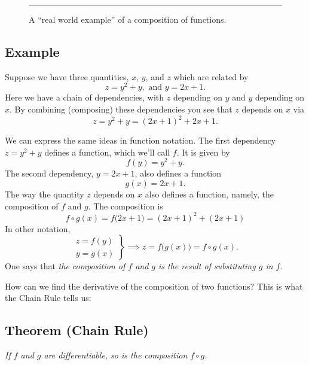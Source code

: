 \begin{figure}[t]
\begin{minipage}[b]{\textwidth}
    \rule{0pt}{6pt}




  \end{minipage}




  \noindent\rule{\textwidth}{1pt}




  \caption{A ``real world example'' of a composition of functions.}
  \label{fig:04growing-balloon}
\end{figure}




\subsection{Example} 
\label{sec:04composition-example}
Suppose we have three quantities, $x$, $y$, and $z$ which are related by
\[
z=y^2+y, \text{ and } y = 2x+1.
\]
Here we have a chain of dependencies, with $z$ depending on $y$ and $y$
depending on $x$.  By combining (composing) these dependencies you see that $z$
depends on $x$ via
\[
z = y^2+y = (2x+1)^2 + 2x+1.
\]




We can express the same ideas in function notation.  The first dependency
$z=y^2+y$ defines a function, which we'll call $f$.  It is given by
\[
f(y) = y^2+y.
\]
The second dependency, $y=2x+1$, also defines a function
\[
g(x) = 2x+1.
\]
The way the quantity $z$ depends on $x$ also defines a function, namely,
the composition of $f$ and $g$.  The composition is
\[
f\circ g(x) =f\bigl(2x+1\bigr) = (2x+1)^2+(2x+1)
\]
In other notation,
\[
\left.
\begin{array}{cc}
z=f(y) \\ y = g(x)
\end{array}
\right\}
\implies z = f\bigl(g(x)\bigr) = f\circ g(x).  
\]
One says that \emph{the composition of $f$ and $g$ is the result of
substituting $g$ in $f$}.




\medskip




How can we find the derivative of the composition of two functions?  This is
what the Chain Rule tells us:


\subsection{Theorem (Chain Rule)} 
\label{thm:chainRule}\itshape
If $f$ and $g$ are differentiable, so is the composition $f\circ g$.




